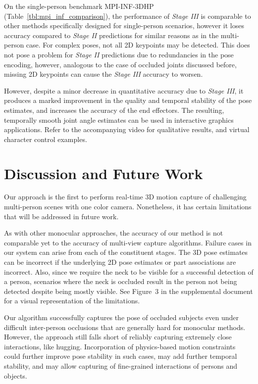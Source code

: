 \documentclass[acmtog,authorversion]{acmart}
\begin{document}
On the single-person benchmark MPI-INF-3DHP (Table~\ref{tbl:mpi_inf_comparison}), the performance of \emph{Stage III} is comparable to other methods specifically designed for single-person scenarios, however it loses accuracy compared to \emph{Stage II} predictions for similar reasons as in the multi-person case. 
For complex poses, not all 2D keypoints may be detected. This does not pose a problem for \textit{Stage II} predictions due to redundancies in the pose encoding, however, analogous to the case of occluded joints discussed before, missing 2D keypoints can cause the \textit{Stage III} accuracy to worsen.

However, despite a minor decrease in quantitative accuracy due to \textit{Stage III}, it produces a marked improvement in the quality and temporal stability of the pose estimates, and increases the accuracy of the end effectors. The resulting, temporally smooth joint angle estimates can be used in interactive graphics applications. Refer to the accompanying video for qualitative results, and virtual character control examples.



 \section{Discussion and Future Work}
\label{sec:discussion}

Our approach is the first to perform real-time 3D motion capture of challenging multi-person scenes with one color camera. Nonetheless, it has certain limitations that will be addressed in future work. 

As with other monocular approaches, the accuracy of our method is not comparable yet to the accuracy of multi-view capture algorithms. 
Failure cases in our system can arise from each of the constituent stages. The 3D pose estimates can be incorrect if the underlying 2D pose estimates or part associations are incorrect. Also, since we require the neck to be visible for a successful detection of a person, scenarios where the neck is occluded result in the person not being detected despite being mostly visible. See Figure~3 in the supplemental document for a visual representation of the limitations. 

Our algorithm successfully captures the pose of occluded subjects even under difficult inter-person occlusions that are generally hard for monocular methods. However, the approach still falls short of reliably capturing extremely close interactions, like hugging. Incorporation of physics-based motion constraints could further improve pose stability in such cases, may add further temporal stability, and may allow capturing of fine-grained interactions of persons and objects.  
\end{document}
